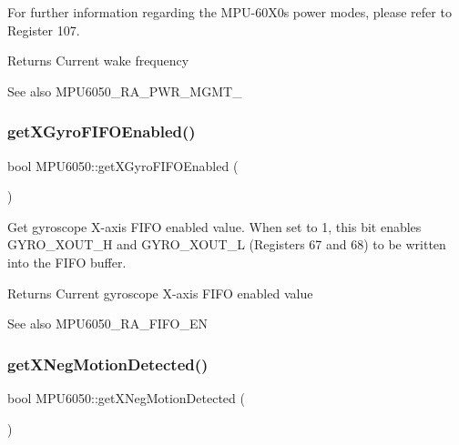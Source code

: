 For further information regarding the M\+P\+U-\/60\+X0\textquotesingle{}s power modes, please refer to Register 107.

\begin{DoxyReturn}{Returns}
Current wake frequency 
\end{DoxyReturn}
\begin{DoxySeeAlso}{See also}
M\+P\+U6050\+\_\+\+R\+A\+\_\+\+P\+W\+R\+\_\+\+M\+G\+M\+T\+\_ 
\end{DoxySeeAlso}
\mbox{\label{class_m_p_u6050_ada9a553176b57815f23fb7d71bb85c9d}} 
\subsubsection{\texorpdfstring{getXGyroFIFOEnabled()}{getXGyroFIFOEnabled()}}
{\footnotesize\ttfamily bool M\+P\+U6050\+::get\+X\+Gyro\+F\+I\+F\+O\+Enabled (\begin{DoxyParamCaption}{ }\end{DoxyParamCaption})}

Get gyroscope X-\/axis F\+I\+FO enabled value. When set to 1, this bit enables G\+Y\+R\+O\+\_\+\+X\+O\+U\+T\+\_\+H and G\+Y\+R\+O\+\_\+\+X\+O\+U\+T\+\_\+L (Registers 67 and 68) to be written into the F\+I\+FO buffer. \begin{DoxyReturn}{Returns}
Current gyroscope X-\/axis F\+I\+FO enabled value 
\end{DoxyReturn}
\begin{DoxySeeAlso}{See also}
M\+P\+U6050\+\_\+\+R\+A\+\_\+\+F\+I\+F\+O\+\_\+\+EN 
\end{DoxySeeAlso}
\mbox{\label{class_m_p_u6050_a446d235905783c5b90637a6b6792ac76}} 
\subsubsection{\texorpdfstring{getXNegMotionDetected()}{getXNegMotionDetected()}}
{\footnotesize\ttfamily bool M\+P\+U6050\+::get\+X\+Neg\+Motion\+Detected (\begin{DoxyParamCaption}{ }\end{DoxyParamCaption})}

